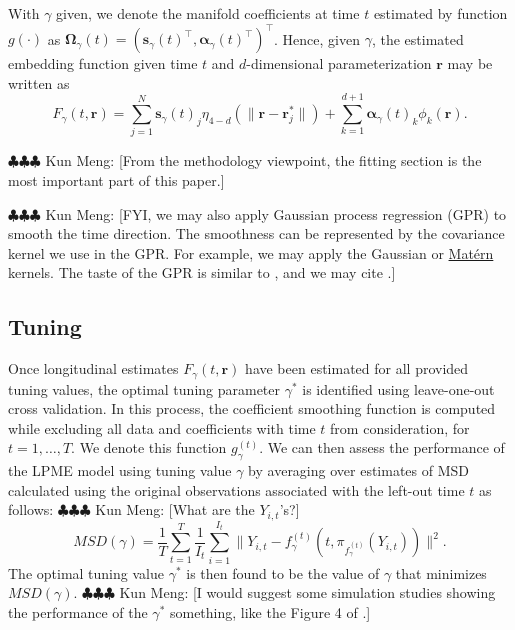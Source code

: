 \documentclass[11pt,reqno]{article}
\newcommand{\T}{\intercal}
\newcommand{\meng}[1]{{\color{purple} \sf $\clubsuit\clubsuit\clubsuit$ Kun Meng: [#1]}}
\theoremstyle{definition}
\begin{document}
With $\gamma$ given, we denote the manifold coefficients at time $t$ estimated by function $g(\cdot)$ as $\boldsymbol{\Omega}_{\gamma}(t) = \left(\boldsymbol{s}_{\gamma}(t)^\T, \boldsymbol{\alpha}_{\gamma}(t)^\T\right)^\T$. Hence, given $\gamma$, the estimated embedding function given time $t$ and $d$-dimensional parameterization $\boldsymbol{r}$ may be written as
\begin{equation}
  F_{\gamma}(t, \boldsymbol{r}) = \sum_{j=1}^{N}\boldsymbol{s}_{\gamma}(t)_j \eta_{4-d}\left(\|\boldsymbol{r} - \boldsymbol{r}_j^*\|\right) + \sum_{k=1}^{d+1}\boldsymbol{\alpha}_{\gamma}(t)_k \phi_k(\boldsymbol{r}). \label{eq:17}
\end{equation}

\meng{From the methodology viewpoint, the fitting section is the most important part of this paper.}

\meng{FYI, we may also apply Gaussian process regression (GPR) to smooth the time direction. The smoothness can be represented by the covariance kernel we use in the GPR. For example, we may apply the Gaussian or \href{https://en.wikipedia.org/wiki/Matern_covariance_function}{Matérn} kernels. The taste of the GPR is similar to \cite{dunson2021inferring}, and we may cite \cite{dunson2021inferring}.}

\subsection*{Tuning}

Once longitudinal estimates $F_{\gamma}(t, \boldsymbol{r})$ have been estimated for all provided tuning values, the optimal tuning parameter $\gamma^*$ is identified using leave-one-out cross validation. In this process, the coefficient smoothing function is computed while excluding all data and coefficients with time $t$ from consideration, for $t = 1, \dots, T$. We denote this function $g_{\gamma}^{(t)}$. We can then assess the performance of the LPME model using tuning value $\gamma$ by averaging over estimates of MSD calculated using the original observations associated with the left-out time $t$ as follows: \meng{What are the $Y_{i,t}$'s?}
\begin{equation}
  MSD(\gamma) = \frac{1}{T} \sum_{t=1}^{T}\frac{1}{I_t}\sum_{i=1}^{I_t}\|Y_{i, t} - f_{\gamma}^{(t)}(t, \pi_{f_{\gamma}^{(t)}}(Y_{i, t}))\|^2. \label{eq:18}
\end{equation}
The optimal tuning value $\gamma^*$ is then found to be the value of $\gamma$ that minimizes $MSD(\gamma)$. \meng{I would suggest some simulation studies showing the performance of the $\gamma^*$ something, like the Figure 4 of \cite{mengPrincipalManifoldEstimation2021}.}
\end{document}
